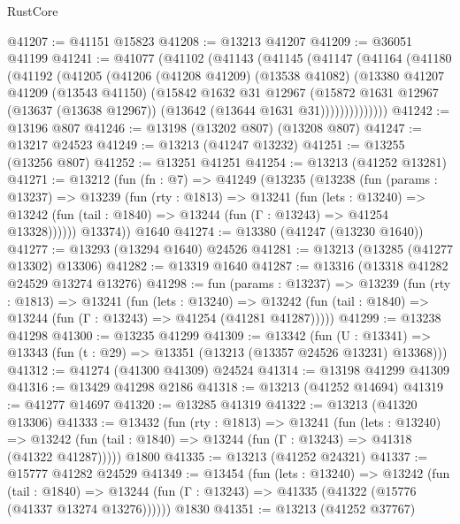 \begin{lexlean}{RustCore}
\begin{coremodule}
@41207 := @41151 @15823
@41208 := @13213 @41207
@41209 := @36051 @41199
@41241 := @41077
    (@41102
      (@41143
        (@41145
          (@41147
            (@41164
              (@41180
                (@41192
                  (@41205
                    (@41206
                      (@41208 @41209)
                      (@13538 @41082)
                      (@13380
                        @41207
                        @41209
                        (@13543 @41150)
                        (@15842
                          @1632
                          @31
                          @12967
                          (@15872
                            @1631
                            @12967
                            (@13637 (@13638 @12967))
                            (@13642 (@13644 @1631 @31))))))))))))))
@41242 := @13196 @807
@41246 := @13198 (@13202 @807) (@13208 @807)
@41247 := @13217 @24523
@41249 := @13213 (@41247 @13232)
@41251 := @13255 (@13256 @807)
@41252 := @13251 @41251
@41254 := @13213 (@41252 @13281)
@41271 := @13212
    (fun (fn : @7) =>
    @41249
      (@13235
        (@13238
          (fun (params : @13237) =>
          @13239
            (fun (rty : @1813) =>
            @13241
              (fun (lets : @13240) =>
              @13242 (fun (tail : @1840) => @13244 (fun (Γ : @13243) => @41254 @13328))))))
        @13374))
    @1640
@41274 := @13380 (@41247 (@13230 @1640))
@41277 := @13293 (@13294 @1640) @24526
@41281 := @13213 (@13285 (@41277 @13302) @13306)
@41282 := @13319 @1640
@41287 := @13316 (@13318 @41282 @24529 @13274 @13276)
@41298 := fun (params : @13237) =>
  @13239
    (fun (rty : @1813) =>
    @13241
      (fun (lets : @13240) =>
      @13242 (fun (tail : @1840) => @13244 (fun (Γ : @13243) => @41254 (@41281 @41287)))))
@41299 := @13238 @41298
@41300 := @13235 @41299
@41309 := @13342
    (fun (U : @13341) => @13343 (fun (t : @29) => @13351 (@13213 (@13357 @24526 @13231) @13368)))
@41312 := @41274 (@41300 @41309) @24524
@41314 := @13198 @41299 @41309
@41316 := @13429 @41298 @2186
@41318 := @13213 (@41252 @14694)
@41319 := @41277 @14697
@41320 := @13285 @41319
@41322 := @13213 (@41320 @13306)
@41333 := @13432
    (fun (rty : @1813) =>
    @13241
      (fun (lets : @13240) =>
      @13242 (fun (tail : @1840) => @13244 (fun (Γ : @13243) => @41318 (@41322 @41287)))))
    @1800
@41335 := @13213 (@41252 @24321)
@41337 := @15777 @41282 @24529
@41349 := @13454
    (fun (lets : @13240) =>
    @13242
      (fun (tail : @1840) =>
      @13244 (fun (Γ : @13243) => @41335 (@41322 (@15776 (@41337 @13274 @13276))))))
    @1830
@41351 := @13213 (@41252 @37767)

\end{coremodule}
\end{lexlean}
